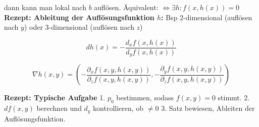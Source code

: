 dann kann man lokal nach $b$ auflösen. Äquivalent: $\iff \exists h: f(x, h(x)) = 0$\\

\textbf{Rezept: Ableitung der Auflösungsfunktion $h$:} Bsp 2-dimensional (auflösen nach $y$) oder 3-dimensional (auflösen nach $z$)

\[
    dh(x) = -\frac{d_x f(x, h(x))}{d_y f(x, h(x))}
\]


\[
    \nabla h(x, y) =
        \left(
            -\frac{\partial_x f(x, y, h(x, y))}{\partial_z f(x, y, h(x, y))},
            -\frac{\partial_y f(x, y, h(x, y))}{\partial_z f(x, y, h(x, y))}
        \right)
\]

\textbf{Rezept: Typische Aufgabe} 1. $p_0$ bestimmen, sodass $f(x, y)=0$ stimmt. 2. $df(x, y)$ berechnen und $d_y$ kontrollieren, ob $\neq 0$ 3. Satz bewiesen, Ableiten der Auflösungsfunktion.
